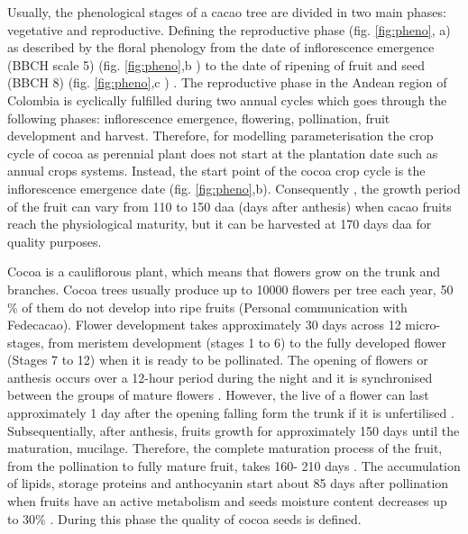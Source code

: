 \documentclass[gene,journal,article,submit,moreauthors,pdftex]{Definitions/mdpi}
\begin{document}
Usually, the phenological stages of a cacao tree are divided in two main phases: vegetative and reproductive. Defining the reproductive phase (fig. \ref{fig:pheno}, a) as described by the floral phenology from the date of inflorescence emergence (BBCH scale 5) (fig. \ref{fig:pheno},b ) to the date of ripening of fruit and seed (BBCH 8) (fig. \ref{fig:pheno},c ) \citep{Niemenak2010}. The reproductive phase in the Andean region of Colombia is cyclically fulfilled during two annual cycles which goes through the following phases: inflorescence emergence, flowering, pollination, fruit development and harvest. Therefore, for modelling parameterisation the crop cycle of cocoa as perennial plant does not start at the plantation date such as annual crops systems. Instead, the start point of the cocoa crop cycle is the inflorescence emergence date (fig. \ref{fig:pheno},b). Consequently , the growth period of the fruit can vary from  110 to 150  daa (days after anthesis) \citep{lopez2018} when cacao fruits reach the physiological maturity, but it can be harvested at 170 days daa \citep{Niemenak2010} for quality purposes.

{\color{red} Cocoa is a cauliflorous plant, which means that flowers grow on the trunk and branches. Cocoa trees usually produce up to 10000 flowers per tree each year, 50 \%  of them do not develop into ripe fruits (Personal communication with Fedecacao). Flower development takes approximately 30 days across 12 micro-stages, from} meristem development (stages 1 to 6) to the fully developed flower (Stages 7 to 12) \citep{swanson2005, lopez2018} when it is ready to be pollinated. The opening of flowers or anthesis  occurs over a 12-hour period during the night and it is synchronised between the groups of mature flowers \citep{Niemenak2010}. However, the live of a flower can last approximately 1 day after the opening falling form the trunk if it is unfertilised \citep{cheesman1927, Niemenak2010}. {\color{red} Subsequentially, after anthesis, fruits growth for approximately 150 days until the maturation, mucilage}. Therefore, the complete maturation process of the fruit, from the pollination to fully mature fruit, takes 160- 210 days \citep{berry1994}. The accumulation of lipids, storage proteins and anthocyanin start about 85 days after pollination when fruits have an active metabolism and seeds moisture content decreases up to 30\% \citep{Lehrian1980, Niemenak2010}. During this phase the quality of cocoa seeds is defined.
\end{document}
